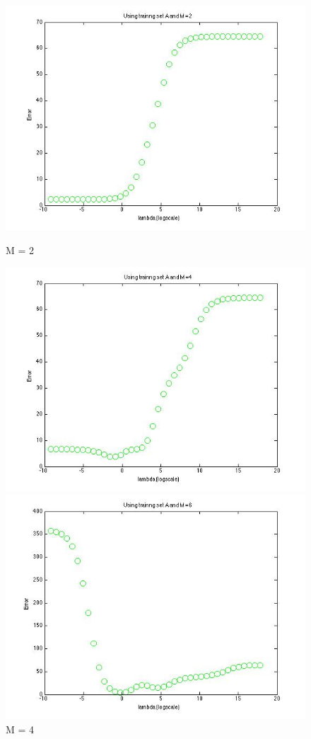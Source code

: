 \begin{figure}[!htb]
  \includegraphics[width=\linewidth]{figures/p3_regressA_m=2}
  \caption{M = 2}\label{fig:figures/p3_regressA_m=2}
\endminipage\hfill
{}
  \includegraphics[width=\linewidth]{figures/p3_regressA_m=4}
  \caption{M = 4}\label{fig:figures/p3_regressA_m=4}
\endminipage\hfill
{}%
  \includegraphics[width=\linewidth]{figures/p3_regressA_m=6}

\end{figure}
